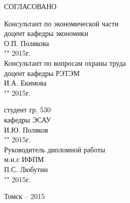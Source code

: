 \begin{singlespace}
 \begin{minipage}[left]{0.45\linewidth}
 СОГЛАСОВАНО
 
 Консультант по экономической части\\
 доцент кафедры экономики \\
 \underline{\hspace{2.5cm}}О.П. Полякова \\
 "\underline{\hspace{1cm}}"\underline{\hspace{3cm}} 2015г.\\

 Консультант по вопросам охраны труда\\
 доцент кафедры РЭТЭМ \\
 \underline{\hspace{2.5cm}}И.А. Екимова\\
 "\underline{\hspace{1cm}}"\underline{\hspace{3cm}} 2015г.\\
 \end{minipage}
 \hfill
 \begin{minipage}[left]{0.4\linewidth}
 студент гр. 530 \\
 кафедры ЭСАУ \\
 \underline{\hspace{2.5cm}}И.Ю. Поляков \\
 "\underline{\hspace{1cm}}"\underline{\hspace{3cm}} 2015г.\\
 
 Руководитель дипломной работы \\
 м.н.с ИФПМ \\
 \underline{\hspace{2.5cm}}П.С. Любутин \\
 "\underline{\hspace{1cm}}"\underline{\hspace{3cm}} 2015г.\\
 \end{minipage}
\end{singlespace}

\vfill
\begin{center}
Томск -- 2015
\end{center}